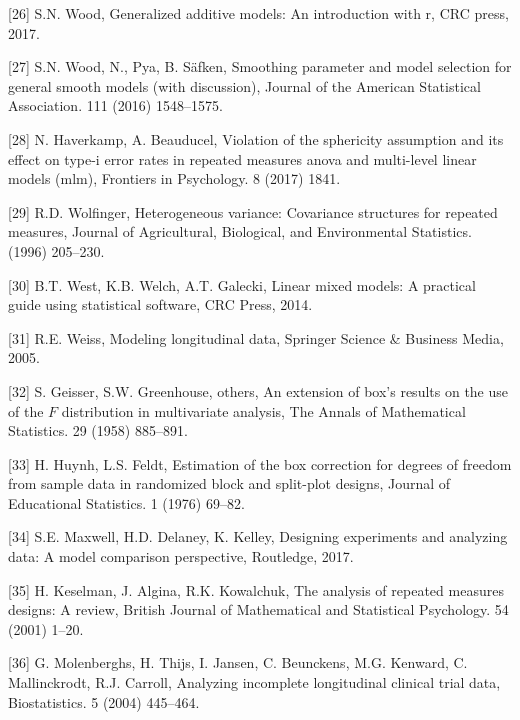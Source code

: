 \documentclass[
]{article}
\begin{document}
\leavevmode\hypertarget{ref-wood2017}{}%
{[}26{]} S.N. Wood, Generalized additive models: An introduction with r, CRC press, 2017.

\leavevmode\hypertarget{ref-wood2016}{}%
{[}27{]} S.N. Wood, N., Pya, B. Säfken, Smoothing parameter and model selection for general smooth models (with discussion), Journal of the American Statistical Association. 111 (2016) 1548--1575.

\leavevmode\hypertarget{ref-haverkamp2017}{}%
{[}28{]} N. Haverkamp, A. Beauducel, Violation of the sphericity assumption and its effect on type-i error rates in repeated measures anova and multi-level linear models (mlm), Frontiers in Psychology. 8 (2017) 1841.

\leavevmode\hypertarget{ref-wolfinger1996}{}%
{[}29{]} R.D. Wolfinger, Heterogeneous variance: Covariance structures for repeated measures, Journal of Agricultural, Biological, and Environmental Statistics. (1996) 205--230.

\leavevmode\hypertarget{ref-west2014}{}%
{[}30{]} B.T. West, K.B. Welch, A.T. Galecki, Linear mixed models: A practical guide using statistical software, CRC Press, 2014.

\leavevmode\hypertarget{ref-weiss2005}{}%
{[}31{]} R.E. Weiss, Modeling longitudinal data, Springer Science \& Business Media, 2005.

\leavevmode\hypertarget{ref-geisser1958}{}%
{[}32{]} S. Geisser, S.W. Greenhouse, others, An extension of box's results on the use of the \(F\) distribution in multivariate analysis, The Annals of Mathematical Statistics. 29 (1958) 885--891.

\leavevmode\hypertarget{ref-huynh1976}{}%
{[}33{]} H. Huynh, L.S. Feldt, Estimation of the box correction for degrees of freedom from sample data in randomized block and split-plot designs, Journal of Educational Statistics. 1 (1976) 69--82.

\leavevmode\hypertarget{ref-maxwell2017}{}%
{[}34{]} S.E. Maxwell, H.D. Delaney, K. Kelley, Designing experiments and analyzing data: A model comparison perspective, Routledge, 2017.

\leavevmode\hypertarget{ref-keselman2001}{}%
{[}35{]} H. Keselman, J. Algina, R.K. Kowalchuk, The analysis of repeated measures designs: A review, British Journal of Mathematical and Statistical Psychology. 54 (2001) 1--20.

\leavevmode\hypertarget{ref-molenberghs2004}{}%
{[}36{]} G. Molenberghs, H. Thijs, I. Jansen, C. Beunckens, M.G. Kenward, C. Mallinckrodt, R.J. Carroll, Analyzing incomplete longitudinal clinical trial data, Biostatistics. 5 (2004) 445--464.
\end{document}
